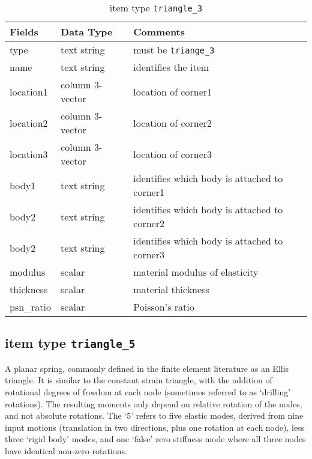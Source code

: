 \begin{table}[!h]
\caption{item type \texttt{triangle\_3}}
\label{triangle3}
\begin{center}
\begin{tabular}{lll}
\toprule
Fields & Data Type & Comments\\
\midrule
type & text string & must be \texttt{triange\_3}\\
name & text string & identifies the item\\
location1 & column 3-vector & location of corner1\\
location2 & column 3-vector & location of corner2\\
location3 & column 3-vector & location of corner3\\
body1 & text string & identifies which body is attached to corner1\\
body2 & text string & identifies which body is attached to corner2\\
body2 & text string & identifies which body is attached to corner3\\
modulus & scalar & material modulus of elasticity\\
thickness & scalar & material thickness\\
psn\_ratio & scalar & Poisson's ratio\\
\bottomrule
\end{tabular}
\end{center}
\end{table}
\clearpage

\subsection{item type \texttt{triangle\_5}}
A planar spring, commonly defined in the finite element literature as an Ellis triangle.  It is similar to the constant strain triangle, with the addition of rotational degrees of freedom at each node (sometimes referred to as `drilling' rotations).  The resulting moments only depend on relative rotation of the nodes, and not absolute rotations.  The `5' refers to five elastic modes, derived from nine input motions (translation in two directions, plus one rotation at each node), less three `rigid body' modes, and one `false' zero stiffness mode where all three nodes have identical non-zero rotations. 

